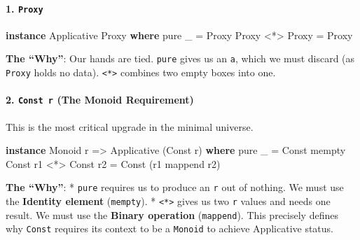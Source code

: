 \documentclass[
]{article}
\newenvironment{Shaded}{}{}
\newcommand{\DataTypeTok}[1]{\textcolor[rgb]{0.56,0.13,0.00}{#1}}
\newcommand{\FunctionTok}[1]{\textcolor[rgb]{0.02,0.16,0.49}{#1}}
\newcommand{\KeywordTok}[1]{\textcolor[rgb]{0.00,0.44,0.13}{\textbf{#1}}}
\newcommand{\NormalTok}[1]{#1}
\newcommand{\OperatorTok}[1]{\textcolor[rgb]{0.40,0.40,0.40}{#1}}
\newcommand{\OtherTok}[1]{\textcolor[rgb]{0.00,0.44,0.13}{#1}}
\begin{document}
\paragraph{\texorpdfstring{1. \texttt{Proxy}}{1. Proxy}}\label{proxy}

\begin{Shaded}
\begin{Highlighting}[]
\KeywordTok{instance} \DataTypeTok{Applicative} \DataTypeTok{Proxy} \KeywordTok{where}
    \FunctionTok{pure}\NormalTok{ \_ }\OtherTok{=} \DataTypeTok{Proxy}
    \DataTypeTok{Proxy} \OperatorTok{\textless{}*\textgreater{}} \DataTypeTok{Proxy} \OtherTok{=} \DataTypeTok{Proxy}
\end{Highlighting}
\end{Shaded}

\textbf{The ``Why''}: Our hands are tied. \texttt{pure} gives us an
\texttt{a}, which we must discard (as \texttt{Proxy} holds no data).
\texttt{\textless{}*\textgreater{}} combines two empty boxes into one.

\paragraph{\texorpdfstring{2. \texttt{Const\ r} (The Monoid
Requirement)}{2. Const r (The Monoid Requirement)}}\label{const-r-the-monoid-requirement}

This is the most critical upgrade in the minimal universe.

\begin{Shaded}
\begin{Highlighting}[]
\KeywordTok{instance} \DataTypeTok{Monoid}\NormalTok{ r }\OtherTok{=\textgreater{}} \DataTypeTok{Applicative}\NormalTok{ (}\DataTypeTok{Const}\NormalTok{ r) }\KeywordTok{where}
    \FunctionTok{pure}\NormalTok{ \_ }\OtherTok{=} \DataTypeTok{Const} \FunctionTok{mempty}
    \DataTypeTok{Const}\NormalTok{ r1 }\OperatorTok{\textless{}*\textgreater{}} \DataTypeTok{Const}\NormalTok{ r2 }\OtherTok{=} \DataTypeTok{Const}\NormalTok{ (r1 }\OtherTok{\textasciigrave{}mappend\textasciigrave{}}\NormalTok{ r2)}
\end{Highlighting}
\end{Shaded}

\textbf{The ``Why''}: * \texttt{pure} requires us to produce an
\texttt{r} out of nothing. We must use the \textbf{Identity element}
(\texttt{mempty}). * \texttt{\textless{}*\textgreater{}} gives us two
\texttt{r} values and needs one result. We must use the \textbf{Binary
operation} (\texttt{mappend}). This precisely defines why \texttt{Const}
requires its context to be a \texttt{Monoid} to achieve Applicative
status.
\end{document}
